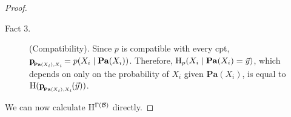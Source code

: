 \documentclass{article}
\newcommand{\bp}[1][L]{\mat{p}_{\!_{#1}\!}}
\def\Pa{\mathbf{Pa}}
\def\extrainfo{extra information}
\begin{document}
\begin{proof}
\begin{description}
	\item[Fact 3.] (Compatibility). Since $p$ is compatible with every cpt, $\bp[\Pa(X_i),X_i] = p(X_i \mid \Pa(X_i))$. Therefore, $\H_p(X_i \mid \Pa(X_i) = \vec y) $, which depends on only on the probability of $X_i$ given $\Pa(X_i)$, is equal to $\H(\bp[\Pa(X_i),X_i](\vec y))$. 
	\end{description}
	We can now calculate $\mathrm{H}^{\Gamma(\cal B)}$ directly.
		
		

\end{proof}
\end{document}
